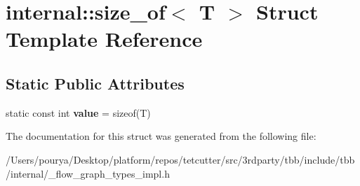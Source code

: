 \hypertarget{structinternal_1_1size__of}{}\section{internal\+:\+:size\+\_\+of$<$ T $>$ Struct Template Reference}
\label{structinternal_1_1size__of}
\subsection*{Static Public Attributes}
\begin{DoxyCompactItemize}
\item 
\hypertarget{structinternal_1_1size__of_a4ef16be8ce41b693009d80eb5fd951a0}{}static const int {\bfseries value} = sizeof(T)\label{structinternal_1_1size__of_a4ef16be8ce41b693009d80eb5fd951a0}

\end{DoxyCompactItemize}


The documentation for this struct was generated from the following file\+:\begin{DoxyCompactItemize}
\item 
/\+Users/pourya/\+Desktop/platform/repos/tetcutter/src/3rdparty/tbb/include/tbb/internal/\+\_\+flow\+\_\+graph\+\_\+types\+\_\+impl.\+h\end{DoxyCompactItemize}

